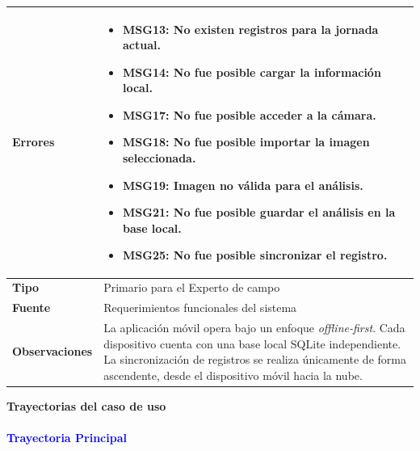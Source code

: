 \begin{longtable}{|p{3.3cm}|p{10cm}|}
\textbf{Errores} & 
\begin{itemize}
    \item MSG13: No existen registros para la jornada actual.
    \item MSG14: No fue posible cargar la información local.
    \item MSG17: No fue posible acceder a la cámara.
    \item MSG18: No fue posible importar la imagen seleccionada.
    \item MSG19: Imagen no válida para el análisis.
    \item MSG21: No fue posible guardar el análisis en la base local.
    \item MSG25: No fue posible sincronizar el registro.
\end{itemize} \\ \hline

\textbf{Tipo} & Primario para el Experto de campo \\ \hline

\textbf{Fuente} & Requerimientos funcionales del sistema \\ \hline

\textbf{Observaciones} & 
La aplicación móvil opera bajo un enfoque \textit{offline-first}. Cada dispositivo cuenta con una base local SQLite independiente. La sincronización de registros se realiza únicamente de forma ascendente, desde el dispositivo móvil hacia la nube. \\ \hline

\end{longtable}

{\large {\textbf{Trayectorias del caso de uso}}}

\vspace{0.5em}
\paragraph{\textbf{\textcolor{blue}{Trayectoria Principal}}}

